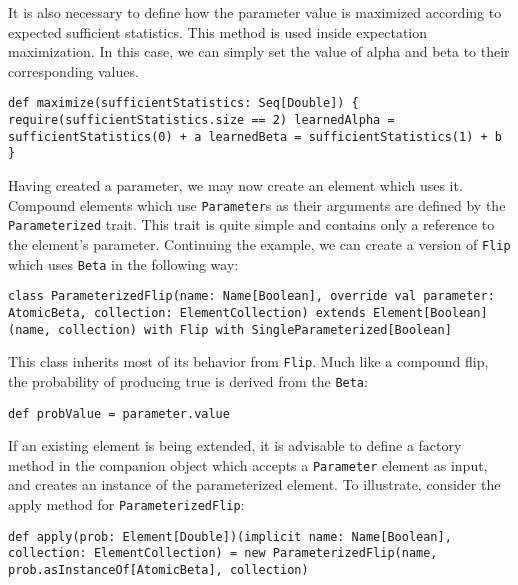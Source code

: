 It is also necessary to define how the parameter value is maximized according to expected sufficient statistics. This method is used inside expectation maximization. In this case, we can simply set the value of alpha and beta to their corresponding values.

\begin{flushleft}
\texttt{def maximize(sufficientStatistics: Seq[Double]) \{
\newline \tab require(sufficientStatistics.size == 2)
\newline \tab learnedAlpha = sufficientStatistics(0) + a
\newline \tab learnedBeta = sufficientStatistics(1) + b
\newline \}
}
\end{flushleft}

Having created a parameter, we may now create an element which uses it. Compound elements which use \texttt{Parameter}s as their arguments are defined by the \texttt{Parameterized} trait. This trait is quite simple and contains only a reference to the element's parameter. Continuing the example, we can create a version of \texttt{Flip} which uses \texttt{Beta} in the following way:

\begin{flushleft}
\texttt{class ParameterizedFlip(name: Name[Boolean], override val parameter: AtomicBeta, collection: ElementCollection)
\newline extends Element[Boolean](name, collection) with Flip 
\newline with SingleParameterized[Boolean]
}
\end{flushleft}

This class inherits most of its behavior from \texttt{Flip}. Much like a compound flip, the probability of producing true is derived from the \texttt{Beta}:

\begin{flushleft}
\texttt{def probValue = parameter.value}
\end{flushleft}

If an existing element is being extended, it is advisable to define a factory method in the companion object which accepts a \texttt{Parameter} element as input, and creates an instance of the parameterized element. To illustrate, consider the apply method for \texttt{ParameterizedFlip}:

\begin{flushleft}
\texttt{def apply(prob: Element[Double])(implicit name: Name[Boolean], collection: ElementCollection) =
\newline \tab new ParameterizedFlip(name, prob.asInstanceOf[AtomicBeta], collection)
}
\end{flushleft}

